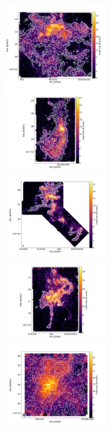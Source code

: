 \documentclass[traditabstract]{aa}
\begin{document}
\begin{figure}[h]
  \centering
  \includegraphics[height=4.5cm,trim=50 40 50 40,clip=true]{Figures/Draco1_stack.png}
  \hspace{3mm}
  \includegraphics[height=4.5cm,trim=50 40 50 40,clip=true]{Figures/Draco4_stack.png} \\
  \includegraphics[height=4.5cm,trim=50 40 50 40,clip=true]{Figures/Draco2+9_stack.png}
  \hspace{3mm}
  \includegraphics[height=4.5cm,trim=50 40 50 40,clip=true]{Figures/Draco5_stack.png} \\
  \includegraphics[height=4.5cm,trim=50 40 50 40,clip=true]{Figures/Draco3_stack.png}

\end{figure}
\end{document}
